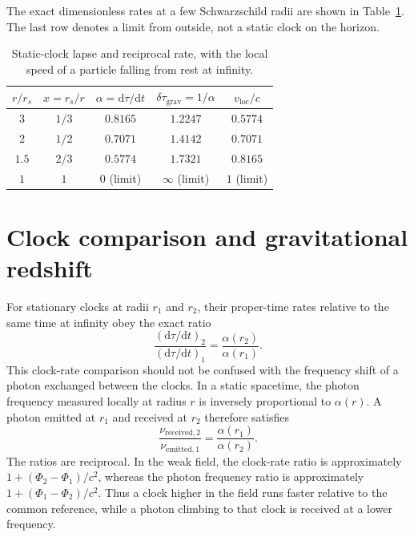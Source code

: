 \documentclass[12pt]{article}
\begin{document}
The exact dimensionless rates at a few Schwarzschild radii are shown in Table~\ref{tab:landmarks}. The last row denotes a limit from outside, not a static clock on the horizon.
\begin{table}[ht]
  \centering
  \caption{Static-clock lapse and reciprocal rate, with the local speed of a particle falling from rest at infinity.}
  \label{tab:landmarks}
  \begin{tabular}{ccccc}
    \toprule
    $r/r_s$ & $x=r_s/r$ & $\alpha=\mathrm{d}\tau/\mathrm{d}t$ & $\delta\tau_{\mathrm{grav}}=1/\alpha$ & $v_{\mathrm{loc}}/c$ \\
    \midrule
    $3$ & $1/3$ & $0.8165$ & $1.2247$ & $0.5774$ \\
    $2$ & $1/2$ & $0.7071$ & $1.4142$ & $0.7071$ \\
    $1.5$ & $2/3$ & $0.5774$ & $1.7321$ & $0.8165$ \\
    $1$ & $1$ & $0$ (limit) & $\infty$ (limit) & $1$ (limit) \\
    \bottomrule
  \end{tabular}
\end{table}

\section{Clock comparison and gravitational redshift}

For stationary clocks at radii $r_1$ and $r_2$, their proper-time rates relative to the same time at infinity obey the exact ratio
\begin{equation}
  \frac{(\mathrm{d}\tau/\mathrm{d}t)_2}
       {(\mathrm{d}\tau/\mathrm{d}t)_1}
  =\frac{\alpha(r_2)}{\alpha(r_1)}.
  \label{eq:clock-comparison}
\end{equation}
This clock-rate comparison should not be confused with the frequency shift of a photon exchanged between the clocks. In a static spacetime, the photon frequency measured locally at radius $r$ is inversely proportional to $\alpha(r)$. A photon emitted at $r_1$ and received at $r_2$ therefore satisfies
\begin{equation}
  \frac{\nu_{\mathrm{received},2}}
       {\nu_{\mathrm{emitted},1}}
  =\frac{\alpha(r_1)}{\alpha(r_2)}.
  \label{eq:photon-redshift}
\end{equation}
The ratios are reciprocal. In the weak field, the clock-rate ratio is approximately $1+(\Phi_2-\Phi_1)/c^2$, whereas the photon frequency ratio is approximately $1+(\Phi_1-\Phi_2)/c^2$. Thus a clock higher in the field runs faster relative to the common reference, while a photon climbing to that clock is received at a lower frequency.
\end{document}
